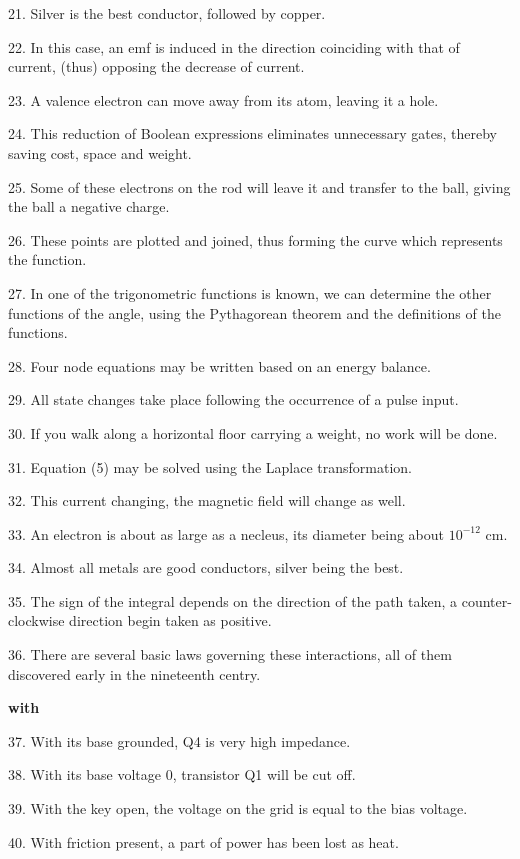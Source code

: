 \documentclass[a4paper,twocolumn,10pt]{article}
\begin{document}
\begin{CJK}{UTF8}{gkai}
	21. Silver is the best conductor, followed by copper.

	22. In this case, an emf is induced in the direction coinciding with that of current,
	(thus) opposing the decrease of current.

	23. A valence electron can move away from its atom, leaving it a hole.

	24. This reduction of Boolean expressions eliminates unnecessary gates, thereby
	saving cost, space and weight.

	25. Some of these electrons on the rod will leave it and transfer to
	the ball, giving the ball a negative charge.

	26. These points are plotted and joined, thus forming the curve which
	represents the function.

	27. In one of the trigonometric functions is known, we can determine the other functions
	of the angle, using the Pythagorean theorem and the definitions of the functions.

	28. Four node equations may be written based on an energy balance.

	29. All state changes take place following the occurrence of a pulse input.

	30. If you walk along a horizontal floor carrying a weight, no work will be done.

	31. Equation (5) may be solved using the Laplace transformation.

	32. This current changing, the magnetic field will change as well.

	33. An electron is about as large as a necleus, its diameter being about $10^{-12}$ cm.

	34. Almost all metals are good conductors, silver being the best.

	35. The sign of the integral depends on the direction of the path taken,
	a counter-clockwise direction begin taken as positive.

	36. There are several basic laws governing these interactions, all 
	of them discovered early in the nineteenth centry.

	{\bf with}

	37. With its base grounded, Q4 is very high impedance.

	38. With its base voltage 0, transistor Q1 will be cut off.

	39. With the key open, the voltage on the grid is equal to the bias voltage.

	40. With friction present, a part of power has been lost as heat.


\end{CJK}
\end{document}
